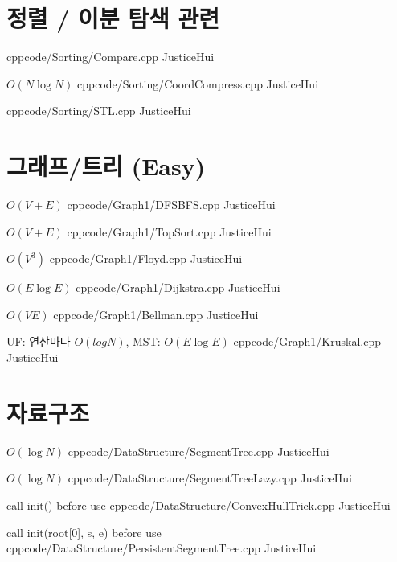 \documentclass[landscape, 8pt, a4paper, twocolumn]{extarticle} %
\begin{document}
\maketitlepage

\pagebreak 

\section{정렬 / 이분 탐색 관련}

{}{}
{cpp}{code/Sorting/Compare.cpp}
{JusticeHui}

{}{$O(N \log N)$}
{cpp}{code/Sorting/CoordCompress.cpp}
{JusticeHui}

{}{}
{cpp}{code/Sorting/STL.cpp}
{JusticeHui}

\section{그래프/트리 (Easy)}

{}{$O(V+E)$}
{cpp}{code/Graph1/DFSBFS.cpp}
{JusticeHui}

{}{$O(V+E)$}
{cpp}{code/Graph1/TopSort.cpp}
{JusticeHui}

{}{$O(V^3)$}
{cpp}{code/Graph1/Floyd.cpp}
{JusticeHui}

{}{$O(E\log E)$}
{cpp}{code/Graph1/Dijkstra.cpp}
{JusticeHui}

{}{$O(VE)$}
{cpp}{code/Graph1/Bellman.cpp}
{JusticeHui}

{}{UF: 연산마다 $O(log N)$, MST: $O(E \log E)$}
{cpp}{code/Graph1/Kruskal.cpp}
{JusticeHui}

\section{자료구조}

{}{$O(\log N)$}
{cpp}{code/DataStructure/SegmentTree.cpp}
{JusticeHui}

{}{$O(\log N)$}
{cpp}{code/DataStructure/SegmentTreeLazy.cpp}
{JusticeHui}

{call init() before use}{}
{cpp}{code/DataStructure/ConvexHullTrick.cpp}
{JusticeHui}

{call init(root[0], s, e) before use}{}
{cpp}{code/DataStructure/PersistentSegmentTree.cpp}
{JusticeHui}
\end{document}

